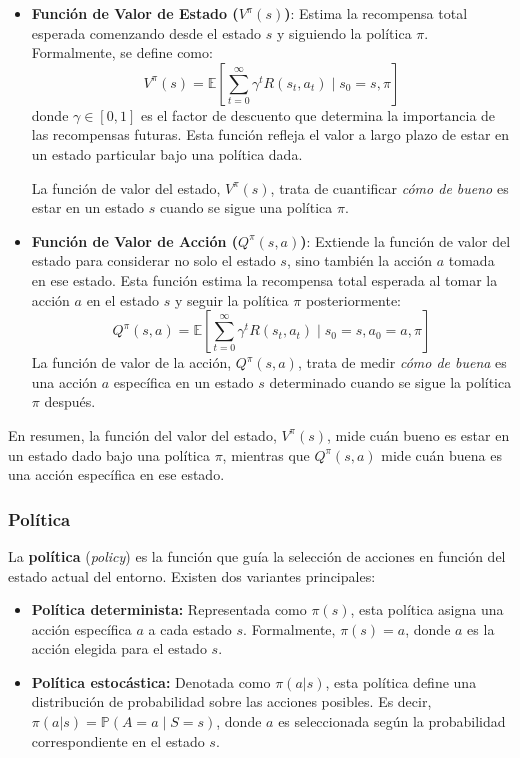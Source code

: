 \documentclass[a4paper,12pt, twoside]{report}
\begin{document}
\begin{itemize}
    \item \textbf{Función de Valor de Estado (\(V^{\pi}(s)\))}: Estima la recompensa total esperada 
    comenzando desde el estado \(s\) y siguiendo la política \(\pi\). Formalmente, se define como:
    \[
    V^{\pi}(s) = \mathbb{E}\left[\sum_{t=0}^{\infty} \gamma^t R(s_t, a_t) \mid s_0 = s, \pi\right]
    \]
    donde \(\gamma \in [0, 1]\) es el factor de descuento que determina la importancia de las 
    recompensas futuras. Esta función refleja el valor a largo plazo de estar en un estado particular 
    bajo una política dada.

    La función de valor del estado, \(V^{\pi}(s)\), trata de cuantificar \textit{cómo de bueno} es 
    estar en un estado \(s\) cuando se sigue una política \(\pi\).

    \item \textbf{Función de Valor de Acción (\(Q^{\pi}(s, a)\))}: Extiende la función de valor del 
    estado para considerar no solo el estado \(s\), sino también la acción \(a\) tomada en ese estado. 
    Esta función estima la recompensa total esperada al tomar la acción \(a\) en el estado \(s\) y 
    seguir la política \(\pi\) posteriormente:
    \[
    Q^{\pi}(s, a) = \mathbb{E}\left[\sum_{t=0}^{\infty} \gamma^t R(s_t, a_t) \mid s_0 = s, a_0 = a, \pi\right]
    \]
    La función de valor de la acción, \(Q^{\pi}(s, a)\), trata de medir \textit{cómo de buena} es una 
    acción \(a\) específica en un estado \(s\) determinado cuando se sigue la política \(\pi\) después.
 
\end{itemize}

En resumen, la función del valor del estado, \(V^{\pi}(s)\), mide cuán bueno es estar en un estado dado 
bajo una política \(\pi\), mientras que \(Q^{\pi}(s, a)\) mide cuán buena es una acción específica en 
ese estado.

\subsubsection{Política}

La \textbf{política} (\textit{policy}) es la función que guía la selección de acciones en función del estado actual del entorno. Existen dos variantes principales:

\begin{itemize}
    \item \textbf{Política determinista:} Representada como $\pi(s)$, esta política asigna una acción específica $a$ a cada estado $s$. Formalmente, $\pi(s) = a$, donde $a$ es la acción elegida para el estado $s$.

    \item \textbf{Política estocástica:} Denotada como $\pi(a|s)$, esta política define una distribución de probabilidad sobre las acciones posibles. Es decir, $\pi(a|s) = \mathbb{P}(A = a \mid S = s)$, donde $a$ es seleccionada según la probabilidad correspondiente en el estado $s$.
\end{itemize}
\end{document}
